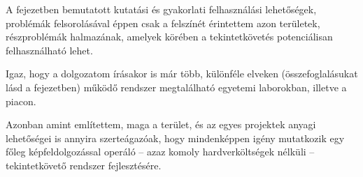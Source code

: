 A fejezetben bemutatott kutatási és gyakorlati felhasználási lehetőségek, problémák felsorolásával éppen csak a felszínét érintettem azon területek, részproblémák halmazának, amelyek körében a tekintetkövetés potenciálisan felhasználható lehet.

Igaz, hogy a dolgozatom írásakor is már több, különféle elveken (összefoglalásukat lásd a  fejezetben) működő rendszer megtalálható egyetemi laborokban, illetve a piacon.

Azonban amint említettem, maga a terület, és az egyes projektek anyagi lehetőségei is annyira szerteágazóak, hogy mindenképpen igény mutatkozik egy főleg képfeldolgozással operáló -- azaz komoly hardverköltségek nélküli -- tekintetkövető rendszer fejlesztésére.
